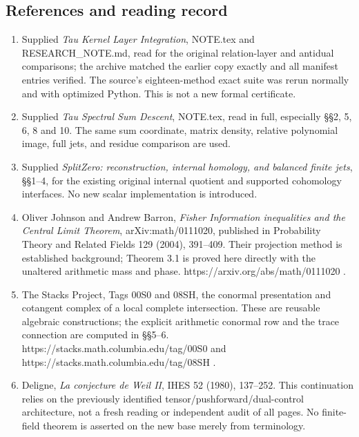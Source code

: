 \documentclass[
]{article}
\providecommand{\tightlist}{%
  \setlength{\itemsep}{0pt}\setlength{\parskip}{0pt}}
\begin{document}
\subsection{References and reading
record}\label{references-and-reading-record}

\begin{enumerate}
\def\labelenumi{\arabic{enumi}.}
\tightlist
\item
  Supplied \emph{Tau Kernel Layer Integration}, NOTE.tex and
  RESEARCH\_NOTE.md, read for the original relation-layer and antidual
  comparisons; the archive matched the earlier copy exactly and all
  manifest entries verified. The source's eighteen-method exact suite
  was rerun normally and with optimized Python. This is not a new formal
  certificate.
\item
  Supplied \emph{Tau Spectral Sum Descent}, NOTE.tex, read in full,
  especially §§2, 5, 6, 8 and 10. The same sum coordinate, matrix
  density, relative polynomial image, full jets, and residue comparison
  are used.
\item
  Supplied \emph{SplitZero: reconstruction, internal homology, and
  balanced finite jets}, §§1--4, for the existing original internal
  quotient and supported cohomology interfaces. No new scalar
  implementation is introduced.
\item
  Oliver Johnson and Andrew Barron, \emph{Fisher Information
  inequalities and the Central Limit Theorem}, arXiv:math/0111020,
  published in Probability Theory and Related Fields 129 (2004),
  391--409. Their projection method is established background; Theorem
  3.1 is proved here directly with the unaltered arithmetic mass and
  phase. https://arxiv.org/abs/math/0111020 .
\item
  The Stacks Project, Tags 00S0 and 08SH, the conormal presentation and
  cotangent complex of a local complete intersection. These are reusable
  algebraic constructions; the explicit arithmetic conormal row and the
  trace connection are computed in §§5--6.
  https://stacks.math.columbia.edu/tag/00S0 and
  https://stacks.math.columbia.edu/tag/08SH .
\item
  Deligne, \emph{La conjecture de Weil II}, IHES 52 (1980), 137--252.
  This continuation relies on the previously identified
  tensor/pushforward/dual-control architecture, not a fresh reading or
  independent audit of all pages. No finite-field theorem is asserted on
  the new base merely from terminology.
\end{enumerate}
\end{document}
